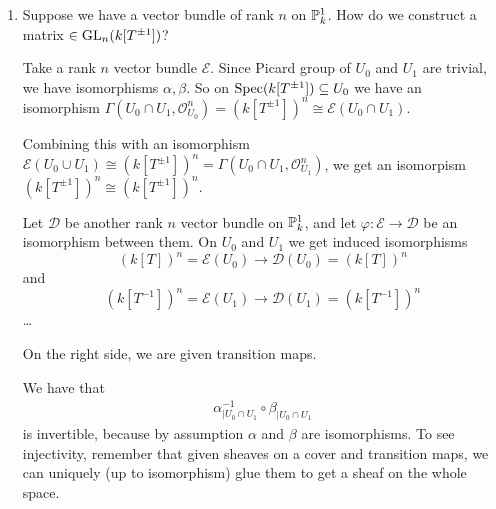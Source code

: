 \newcommand{\sheet}{9}




\maketitle{}

\begin{exercise}{2}
    \begin{enumerate}
        \item{
            Suppose we have a vector bundle of rank $n$ on $\mathbb{P}^1_k$. How do
            we construct a matrix $\in \operatorname{GL}_n(k[T^{\pm 1}])$?

            Take a rank $n$ vector bundle $\mathcal{E}$. Since Picard group of
            $U_0$ and $U_1$ are trivial, we have isomorphisms $\alpha, \beta$.
            So on $\operatorname{Spec}(k[T^{\pm 1}]) \subseteq U_0$ we have an isomorphism
            $\Gamma(U_0 \cap U_1, \mathcal{O}^n_{U_0}) = (k[T^{\pm 1}])^n \cong
            \mathcal{E}(U_0 \cap U_1)$.

            Combining this with an isomorphism $\mathcal{E}(U_0 \cup U_1) \cong
            (k[T^{\pm 1}])^n = \Gamma(U_0 \cap U_1, \mathcal{O}^n_{U_1})$, we
            get an isomorpism $(k[T^{\pm 1}])^n \cong (k[T^{\pm 1}])^n$.

            Let $\mathcal{D}$ be another rank $n$ vector bundle on $\mathbb{P}^1_k$,
            and let $\varphi \colon \mathcal{E} \to \mathcal{D}$ be an
            isomorphism between them.
            On $U_0$ and $U_1$ we get induced isomorphisms
            \begin{equation*}
                (k[T])^n = \mathcal{E}(U_0) \to \mathcal{D}(U_0) = (k[T])^n
            \end{equation*}
            and
            \begin{equation*}
                (k[T^{-1}])^n = \mathcal{E}(U_1) \to \mathcal{D}(U_1) = (k[T^{-1}])^n
            \end{equation*}
            \dots

            On the right side, we are given transition maps. 
        
                We have that
                \begin{align*}
                    \alpha_{| U_0\cap U_1}^{-1} \circ \beta_{| U_0\cap U_1}
                \end{align*}
                is invertible, because by assumption $\alpha$ and $\beta$ are
                isomorphisms. To see injectivity, remember that given sheaves on
                a cover and transition maps, we can uniquely (up to isomorphism)
                glue them to get a sheaf on the whole space.

}
\end{enumerate}
\end{exercise}
